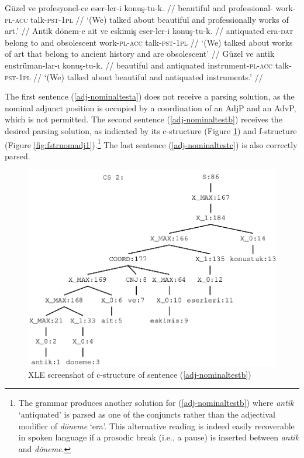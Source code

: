 \pex[glspace=!1em,everygla={},everyglb={},aboveglbskip=-.15ex, interpartskip=15pt]
\label{adj-nominaltest}
\a\label{adj-nominaltesta} 
\begingl
\gla\ljudge{*}Güzel ve profesyonel-ce eser-ler-i konuş-tu-k. //
\glb beautiful and professional- work-\textsc{pl}-\textsc{acc} talk-\textsc{pst}-\textsc{1pl} //
\glft `(We) talked about beautiful and professionally works of art.' //
\endgl
\a\label{adj-nominaltestb} 
\begingl
\gla Antik dönem-e ait ve eskimiş eser-ler-i konuş-tu-k. //
\glb antiquated era-\textsc{dat} {belong to} and obsolescent work-\textsc{pl}-\textsc{acc} talk-\textsc{pst}-\textsc{1pl} //
\glft `(We) talked about works of art that belong to ancient history and are obsolescent' //
\endgl
\a\label{adj-nominaltestc} 
\begingl
\gla Güzel ve antik enstrüman-lar-ı konuş-tu-k. //
\glb beautiful and antiquated instrument-\textsc{pl}-\textsc{acc} talk-\textsc{pst}-\textsc{1pl}  //
\glft `(We) talked about beautiful and antiquated instruments.' //
\endgl
\xe 

The first sentence (\ref{adj-nominaltesta}) does not receive a parsing solution, as the nominal adjunct position is occupied by a coordination of an AdjP and an AdvP, which is not permitted. The second sentence (\ref{adj-nominaltestb}) receives the desired parsing solution, as indicated by its c-structure (Figure \ref{fig:cstr-nomadj1}) and f-structure (Figure \ref{fig:fstrnomadj1}).\footnote{The grammar produces another solution for (\ref{adj-nominaltestb}) where \textit{antik} `antiquated' is parsed as one of the conjuncts rather than the adjectival modifier of \textit{döneme} `era'. This alternative reading is indeed easily recoverable in spoken language if a prosodic break (i.e., a pause) is inserted between \textit{antik} and \textit{döneme}.} The last sentence (\ref{adj-nominaltestc}) is also correctly parsed.


\begin{figure}[H]
	\centering
	\includegraphics[width=0.7\linewidth]{images/implementation/cstr:nomadj1}
	\caption{XLE screenshot of c-structure of sentence (\ref{adj-nominaltestb})}
	\label{fig:cstr-nomadj1}
\end{figure}


